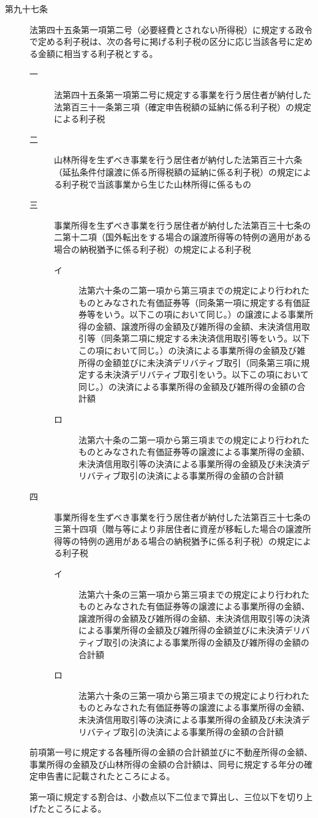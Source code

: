 \documentclass[twocolumn,a4j,10pt]{ltjtarticle}
\begin{document}
\begin{description}
\item[第九十七条]法第四十五条第一項第二号（必要経費とされない所得税）に規定する政令で定める利子税は、次の各号に掲げる利子税の区分に応じ当該各号に定める金額に相当する利子税とする。
\begin{description}
\item[一]法第四十五条第一項第二号に規定する事業を行う居住者が納付した法第百三十一条第三項（確定申告税額の延納に係る利子税）の規定による利子税
\item[二]山林所得を生ずべき事業を行う居住者が納付した法第百三十六条（延払条件付譲渡に係る所得税額の延納に係る利子税）の規定による利子税で当該事業から生じた山林所得に係るもの
\item[三]事業所得を生ずべき事業を行う居住者が納付した法第百三十七条の二第十二項（国外転出をする場合の譲渡所得等の特例の適用がある場合の納税猶予に係る利子税）の規定による利子税
\begin{description}
\item[イ]法第六十条の二第一項から第三項までの規定により行われたものとみなされた有価証券等（同条第一項に規定する有価証券等をいう。以下この項において同じ。）の譲渡による事業所得の金額、譲渡所得の金額及び雑所得の金額、未決済信用取引等（同条第二項に規定する未決済信用取引等をいう。以下この項において同じ。）の決済による事業所得の金額及び雑所得の金額並びに未決済デリバティブ取引（同条第三項に規定する未決済デリバティブ取引をいう。以下この項において同じ。）の決済による事業所得の金額及び雑所得の金額の合計額
\item[ロ]法第六十条の二第一項から第三項までの規定により行われたものとみなされた有価証券等の譲渡による事業所得の金額、未決済信用取引等の決済による事業所得の金額及び未決済デリバティブ取引の決済による事業所得の金額の合計額
\end{description}
\item[四]事業所得を生ずべき事業を行う居住者が納付した法第百三十七条の三第十四項（贈与等により非居住者に資産が移転した場合の譲渡所得等の特例の適用がある場合の納税猶予に係る利子税）の規定による利子税
\begin{description}
\item[イ]法第六十条の三第一項から第三項までの規定により行われたものとみなされた有価証券等の譲渡による事業所得の金額、譲渡所得の金額及び雑所得の金額、未決済信用取引等の決済による事業所得の金額及び雑所得の金額並びに未決済デリバティブ取引の決済による事業所得の金額及び雑所得の金額の合計額
\item[ロ]法第六十条の三第一項から第三項までの規定により行われたものとみなされた有価証券等の譲渡による事業所得の金額、未決済信用取引等の決済による事業所得の金額及び未決済デリバティブ取引の決済による事業所得の金額の合計額
\end{description}
\end{description}
\item[]前項第一号に規定する各種所得の金額の合計額並びに不動産所得の金額、事業所得の金額及び山林所得の金額の合計額は、同号に規定する年分の確定申告書に記載されたところによる。
\item[]第一項に規定する割合は、小数点以下二位まで算出し、三位以下を切り上げたところによる。
\end{description}
\end{document}
